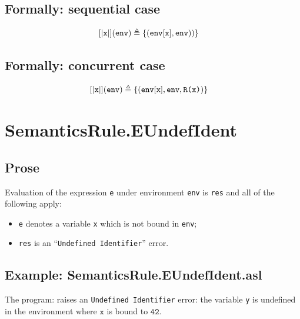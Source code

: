 \documentclass{book}
\begin{document}
\begin{formal}
  \subsection{Formally: sequential case}
  \begin{align}
  \left[| \texttt{x} \right|](\texttt{env}) & \triangleq \left\{ (\texttt{env}[\texttt{x}], \texttt{env})) \right\}
  \label{eq:sem-seq-var}
  \end{align}

  \subsection{Formally: concurrent case}
  \begin{align}
  \left[| \texttt{x} \right|](\texttt{env}) & \triangleq \left\{ (\texttt{env}[\texttt{x}], \texttt{env}, \texttt{R(x)}) \right\}
  \label{eq:sem-conc-var}
  \end{align}
\end{formal}


\section{SemanticsRule.EUndefIdent \label{sec:SemanticsRule.EUndefIdent}}

  \subsection{Prose}
  Evaluation of the expression \texttt{e} under environment \texttt{env} is
  \texttt{res} and all of the following apply:
  \begin{itemize}
  \item \texttt{e} denotes a variable \texttt{x} which is not bound in \texttt{env};
  \item \texttt{res} is an ``\texttt{Undefined Identifier}'' error.
  \end{itemize}

  \subsection{Example: SemanticsRule.EUndefIdent.asl}
    The program:
    raises an \texttt{Undefined Identifier} error: the variable \texttt{y} is
    undefined in the environment where $\mathtt{x}$ is bound to $\mathtt{42}$.
\end{document}

